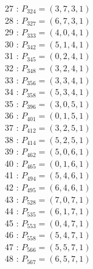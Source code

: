 \documentclass{article}
\begin{document}
{\begin{multicols}{3}
27 : $P_{324}=( 3, 7, 3, 1 )$\\
28 : $P_{327}=( 6, 7, 3, 1 )$\\
29 : $P_{333}=( 4, 0, 4, 1 )$\\
30 : $P_{342}=( 5, 1, 4, 1 )$\\
31 : $P_{345}=( 0, 2, 4, 1 )$\\
32 : $P_{348}=( 3, 2, 4, 1 )$\\
33 : $P_{356}=( 3, 3, 4, 1 )$\\
34 : $P_{358}=( 5, 3, 4, 1 )$\\
35 : $P_{396}=( 3, 0, 5, 1 )$\\
36 : $P_{401}=( 0, 1, 5, 1 )$\\
37 : $P_{412}=( 3, 2, 5, 1 )$\\
38 : $P_{414}=( 5, 2, 5, 1 )$\\
39 : $P_{462}=( 5, 0, 6, 1 )$\\
40 : $P_{465}=( 0, 1, 6, 1 )$\\
41 : $P_{494}=( 5, 4, 6, 1 )$\\
42 : $P_{495}=( 6, 4, 6, 1 )$\\
43 : $P_{528}=( 7, 0, 7, 1 )$\\
44 : $P_{535}=( 6, 1, 7, 1 )$\\
45 : $P_{553}=( 0, 4, 7, 1 )$\\
46 : $P_{558}=( 5, 4, 7, 1 )$\\
47 : $P_{566}=( 5, 5, 7, 1 )$\\
48 : $P_{567}=( 6, 5, 7, 1 )$\\
\end{multicols}


%


%


}%
\end{document}

